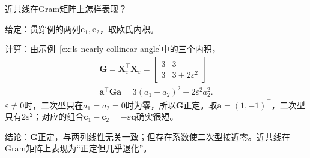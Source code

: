 近共线在Gram矩阵上怎样表现？
\begin{example}[近共线两列的Gram矩阵]
\label{ex:ls-nearly-collinear-gram}
给定：贯穿例的两列$\bm c_1,\bm c_2$，取欧氏内积。

计算：由示例~\ref{ex:ls-nearly-collinear-angle}中的三个内积，
\[
\begin{gathered}
\bm G=\bm X_\varepsilon^\top\bm X_\varepsilon=\begin{bmatrix}3&3\\3&3+2\varepsilon^2\end{bmatrix}\\
\bm a^\top\bm G\bm a=3(a_1+a_2)^2+2\varepsilon^2a_2^2 .
\end{gathered}
\]
$\varepsilon\neq0$时，二次型只在$a_1=a_2=0$时为零，所以$\bm G$正定。取$\bm a=(1,-1)^\top$，二次型只有$2\varepsilon^2$；对应的组合$\bm c_1-\bm c_2=-\varepsilon\bm q$确实很短。

结论：$\bm G$正定，与两列线性无关一致；但存在系数使二次型接近零。近共线在Gram矩阵上表现为“正定但几乎退化”。
\end{example}

